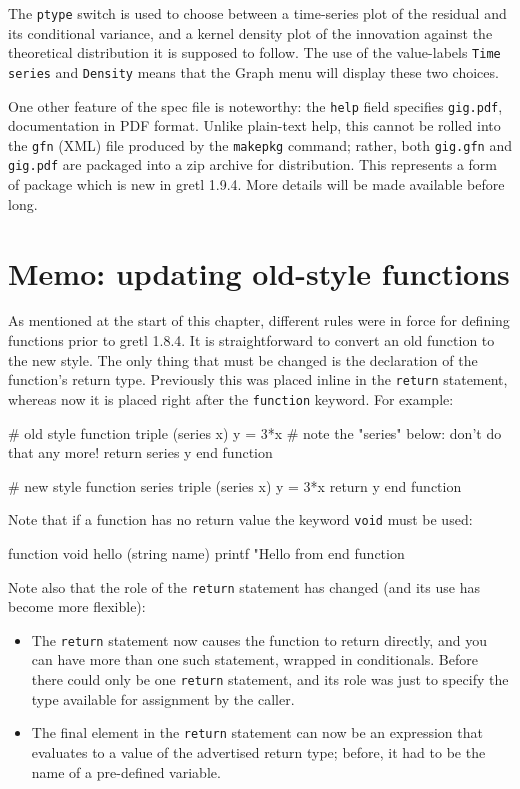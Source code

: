 The \texttt{ptype} switch is used to choose between a time-series plot
of the residual and its conditional variance, and a kernel density
plot of the innovation against the theoretical distribution it is
supposed to follow. The use of the value-labels \texttt{Time series}
and \texttt{Density} means that the \textsf{Graph} menu will display
these two choices.

One other feature of the  spec file is noteworthy: the
\texttt{help} field specifies \texttt{gig.pdf}, documentation in PDF
format. Unlike plain-text help, this cannot be rolled into the
\texttt{gfn} (XML) file produced by the \texttt{makepkg} command;
rather, both \texttt{gig.gfn} and \texttt{gig.pdf} are packaged into a
zip archive for distribution. This represents a form of package
which is new in gretl 1.9.4. More details will be made
available before long. 

\section{Memo: updating old-style functions}
\label{sec:old-func}

As mentioned at the start of this chapter, different rules were in
force for defining functions prior to gretl 1.8.4. It is
straightforward to convert an old function to the new style. The only
thing that must be changed is the declaration of the function's return
type.  Previously this was placed inline in the \texttt{return}
statement, whereas now it is placed right after the \texttt{function}
keyword. For example:
%
\begin{code}
# old style
function triple (series x)
  y = 3*x
  # note the "series" below: don't do that any more!
  return series y
end function

# new style
function series triple (series x)
  y = 3*x
  return y
end function
\end{code}

Note that if a function has no return value the keyword \texttt{void}
must be used:
\begin{code}
function void hello (string name)
  printf "Hello from %
end function
\end{code}

Note also that the role of the \texttt{return} statement has changed
(and its use has become more flexible):

\begin{itemize}
\item The \texttt{return} statement now causes the function to return
  directly, and you can have more than one such statement, wrapped in
  conditionals. Before there could only be one \texttt{return}
  statement, and its role was just to specify the type available for
  assignment by the caller.
\item The final element in the \texttt{return} statement can now be an
  expression that evaluates to a value of the advertised return type;
  before, it had to be the name of a pre-defined variable.
\end{itemize}



